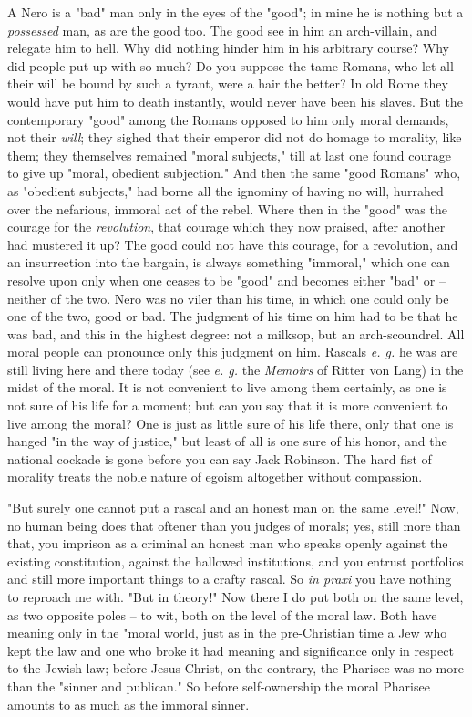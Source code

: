 \documentclass[a4paper]{book}
\begin{document}
A Nero is a "{}bad"{} man only in the eyes of the "{}good"{}; in mine he is 
nothing but a \textit{possessed} man, as are the good too. The good see in him 
an arch-villain, and relegate him to hell. Why did nothing hinder him in his 
arbitrary course? Why did people put up with so much? Do you suppose the tame 
Romans, who let all their will be bound by such a tyrant, were a hair the 
better? In old Rome they would have put him to death instantly, would never 
have been his slaves. But the contemporary "{}good"{} among the Romans opposed 
to him only moral demands, not their \textit{will}; they sighed that their 
emperor did not do homage to morality, like them; they themselves remained 
"{}moral subjects,"{} till at last one found courage to give up "{}moral, 
obedient subjection."{} And then the same "{}good Romans"{} who, as 
"{}obedient subjects,"{} had borne all the ignominy of having no will, 
hurrahed over the nefarious, immoral act of the rebel. Where then in the 
"{}good"{} was the courage for the \textit{revolution}, that courage which 
they now praised, after another had mustered it up? The good could not have 
this courage, for a revolution, and an insurrection into the bargain, is 
always something "{}immoral,"{} which one can resolve upon only when one 
ceases to be "{}good"{} and becomes either "{}bad"{} or -- neither of the two. 
Nero was no viler than his time, in which one could only be one of the two, 
good or bad. The judgment of his time on him had to be that he was bad, and 
this in the highest degree: not a milksop, but an arch-scoundrel. All moral 
people can pronounce only this judgment on him. Rascals \textit{e. g.} he was 
are still living here and there today (see \textit{e. g.} the \textit{Memoirs} 
of Ritter von Lang) in the midst of the moral. It is not convenient to live 
among them certainly, as one is not sure of his life for a moment; but can you 
say that it is more convenient to live among the moral? One is just as little 
sure of his life there, only that one is hanged "{}in the way of justice,"{} 
but least of all is one sure of his honor, and the national cockade is gone 
before you can say Jack Robinson. The hard fist of morality treats the noble 
nature of egoism altogether without compassion.

"{}But surely one cannot put a rascal and an honest man on the same level!"{} 
Now, no human being does that oftener than you judges of morals; yes, still 
more than that, you imprison as a criminal an honest man who speaks openly 
against the existing constitution, against the hallowed institutions, and you 
entrust portfolios and still more important things to a crafty rascal. So 
\textit{in praxi} you have nothing to reproach me with. "{}But in theory!"{} 
Now there I do put both on the same level, as two opposite poles -- to wit, 
both on the level of the moral law. Both have meaning only in the "{}moral 
world, just as in the pre-Christian time a Jew who kept the law and one who 
broke it had meaning and significance only in respect to the Jewish law; 
before Jesus Christ, on the contrary, the Pharisee was no more than the 
"{}sinner and publican."{} So before self-ownership the moral Pharisee amounts 
to as much as the immoral sinner.
\end{document}
